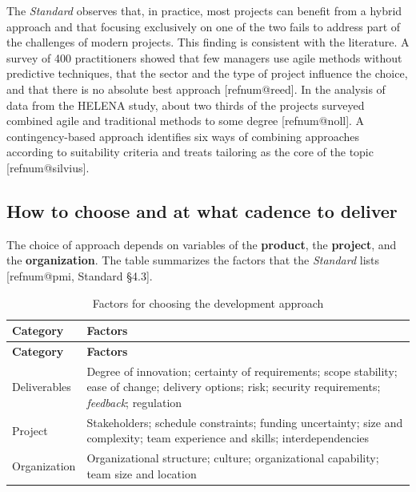\documentclass[12pt,a4paper,article,oneside,brazil,english]{abntex2}
\makeatletter
\newcommand{\fontetab}[1]{\par\vspace{3pt}{\small\noindent Source: #1\par}}
\newcommand{\refnum}[1]{\csname refnum@#1\endcsname}
\newcommand{\cit}[1]{[\refnum{#1}]}
\makeatother
\begin{document}
The \textit{Standard} observes that, in practice, most projects can benefit from a hybrid approach and that focusing exclusively on one of the two fails to address part of the challenges of modern projects. This finding is consistent with the literature. A survey of 400 practitioners showed that few managers use agile methods without predictive techniques, that the sector and the type of project influence the choice, and that there is no absolute best approach [\refnum{reed}]. In the analysis of data from the HELENA study, about two thirds of the projects surveyed combined agile and traditional methods to some degree [\refnum{noll}]. A contingency-based approach identifies six ways of combining approaches according to suitability criteria and treats tailoring as the core of the topic [\refnum{silvius}].
\subsection{How to choose and at what cadence to deliver}

The choice of approach depends on variables of the \textbf{product}, the \textbf{project}, and the \textbf{organization}. The table summarizes the factors that the \textit{Standard} lists [\refnum{pmi}, Standard §4.3].

\begingroup\SingleSpacing\small
\begin{longtable}{@{}>{\raggedright\arraybackslash}p{}>{\raggedright\arraybackslash}p{}@{}}
\caption{Factors for choosing the development approach}\label{tab:t5}\\
\hline
\textbf{Category} & \textbf{Factors}\\
\hline
\endfirsthead
\hline
\textbf{Category} & \textbf{Factors}\\
\hline
\endhead
\hline
\endfoot
\hline
\endlastfoot
Deliverables & Degree of innovation; certainty of requirements; scope stability; ease of change; delivery options; risk; security requirements; \textit{feedback}; regulation\\[3pt]
Project & Stakeholders; schedule constraints; funding uncertainty; size and complexity; team experience and skills; interdependencies\\[3pt]
Organization & Organizational structure; culture; organizational capability; team size and location\\[3pt]
\end{longtable}
\endgroup
\fontetab{Prepared by the authors (2026), based on \cit{pmi}.}
\end{document}

